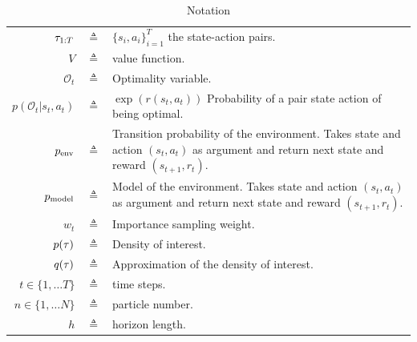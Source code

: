 \begin{table}[H]\caption{Notation}
\begin{center}%
\begin{tabular}{r c p{10cm} }
\toprule
$\tau_{1:T}$ & $\triangleq$ & $\{s_i, a_i\}_{i=1}^T$ the state-action pairs.\\
$V$  & $\triangleq$ & value function.\\
$\mathcal{O}_t$ & $\triangleq$ & Optimality variable.\\
$p(\mathcal{O}_t|s_t, a_t)$ & $\triangleq$ & $\exp(r(s_t, a_t))$ Probability of a pair state action of being optimal.\\
$p_{\text{env}}$ & $\triangleq$ & Transition probability of the environment. Takes state and action $(s_t, a_t)$ as argument and return next state and reward $(s_{t+1}, r_t)$.\\
$p_{\rm{model}}$ & $\triangleq$ & Model of the environment. Takes state and action $(s_t, a_t)$ as argument and return next state and reward $(s_{t+1}, r_t)$.\\
$w_t$ & $\triangleq$ & Importance sampling weight.\\ 
$p(\tau)$  & $\triangleq$ & Density of interest.\\
$q(\tau)$  & $\triangleq$ & Approximation of the density of interest.\\
$t \in \{1, \ldots T\}$ & $\triangleq$ & time steps. \\
$n \in \{1, \ldots N\}$ & $\triangleq$ & particle number. \\
$h$ & $\triangleq$ & horizon length. \\
\bottomrule
\end{tabular}
\end{center}
\label{tab:notation}
\end{table}

%


